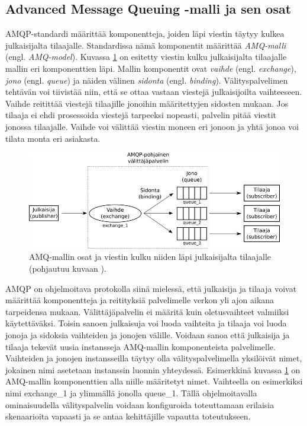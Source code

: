 \subsection{Advanced Message Queuing -malli ja sen osat}
AMQP-standardi määrittää komponentteja, joiden läpi viestin täytyy kulkea julkaisijalta tilaajalle. Standardissa nämä komponentit määrittää \emph{AMQ-malli} (engl. \emph{AMQ-model}). Kuvassa \ref{fig:amq-model-parts} on esitetty viestin kulku julkaisijalta tilaajalle mallin eri komponenttien läpi. Mallin komponentit ovat \emph{vaihde} (engl. \emph{exchange}), \emph{jono} (engl. \emph{queue}) ja näiden välinen \emph{sidonta} (engl. \emph{binding}). Välityspalvelimen tehtävän voi tiivistää niin, että se ottaa vastaan viestejä julkaisijoilta vaihteeseen. Vaihde reitittää viestejä tilaajille jonoihin määritettyjen sidosten mukaan. Jos tilaaja ei ehdi prosessoida viestejä tarpeeksi nopeasti, palvelin pitää viestit jonossa tilaajalle. Vaihde voi välittää viestin moneen eri jonoon ja yhtä jonoa voi tilata monta eri asiakasta.

\begin{figure}[ht!]
	\includegraphics[width=1\textwidth]{pictures/amq-model-parts.png}
	\caption{AMQ-mallin osat ja viestin kulku niiden läpi julkaisijalta tilaajalle (pohjautuu kuvaan \mbox{\cite[s.~11]{AMQP-specification}}).}
	\label{fig:amq-model-parts}
\end{figure}

AMQP on ohjelmoitava protokolla siinä mielessä, että julkaisija ja tilaaja voivat määrittää komponentteja ja reitityksiä palvelimelle verkon yli ajon aikana tarpeidensa mukaan. Välittäjäpalvelin ei määritä kuin oletusvaihteet valmiiksi käytettäväksi. Toisin sanoen julkaisuja voi luoda vaihteita ja tilaaja voi luoda jonoja ja sidoksia vaihteiden ja jonojen välille. Voidaan sanoa että julkaisija ja tilaaja tekevät uusia instansseja AMQ-mallin komponenteista palvelimelle. Vaihteiden ja jonojen instansseilla täytyy olla välityspalvelimella yksilöivät nimet, jokainen nimi asetetaan instanssin luonnin yhteydessä. Esimerkkinä kuvassa \ref{fig:amq-model-parts} on AMQ-mallin komponenttien alla niille määritetyt nimet. Vaihteella on esimerkiksi nimi exchange\_1 ja ylimmällä jonolla queue\_1. Tällä ohjelmoitavalla ominaisuudella välityspalvelin voidaan konfiguroida toteuttamaan erilaisia skenaarioita vapaasti ja se antaa kehittäjille vapautta toteutukseen.


